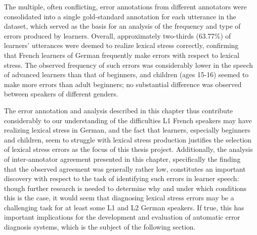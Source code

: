 \documentclass[11pt,a4paper,onecolumn]{article}
\newcommand{\TODO}[1]{{\color{red}\textbf{[TODO #1]}}}
\begin{document}
	The multiple, often conflicting, error annotations from different annotators were consolidated into a single gold-standard annotation for each utterance in the dataset, %
	which served as the basis for an analysis of the frequency and type of errors produced by learners. %
	Overall, approximately two-thirds (63.77\%) of learners' utterances were deemed to realize lexical stress correctly, confirming that French learners of German frequently make errors with respect to lexical stress. %
	The observed frequency of such errors was considerably lower in the speech of advanced learners than that of beginners, %
	and children (ages 15-16) seemed to make more errors than adult beginners; %
	no substantial difference was observed between speakers of different genders. 
	
	The error annotation and analysis described in this chapter thus contribute considerably to our understanding of the difficulties L1 French speakers may have realizing lexical stress in 
	German, 
	and the fact that learners, especially beginners and children, seem to struggle with lexical stress production justifies the selection of lexical stress errors as the focus of this thesis project. Additionally, the analysis of inter-annotator agreement presented in this chapter, specifically the finding that the observed agreement was generally rather low,
	constitutes an important discovery with respect to the task of identifying such errors in learner speech:
	though further research is needed to determine why and under which conditions this is the case, %
	it would seem that diagnosing lexical stress errors may be a challenging task for at least some L1 and L2 German speakers. If true, this has important implications for the development and evaluation of automatic error diagnosis systems, 
	which is the subject of the following section.
\end{document}
